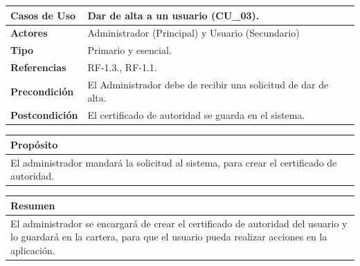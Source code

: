 \begin{itemize}
    \begin{table}[h!]
        \centering
        \begin{tabular}{|l|p{}|}
            \hline
            \textbf{Casos de Uso}   &   Dar de alta a un usuario (CU\_03). \\
            \hline 
            \textbf{Actores}        &   Administrador (Principal) y Usuario (Secundario)\\ 
            \hline 
            \textbf{Tipo}           &   Primario y esencial. \\ 
            \hline
            \textbf{Referencias}    &   RF-1.3., RF-1.1. \\ 
            \hline
            \textbf{Precondición}   &   El Administrador debe de recibir una solicitud de dar de alta. \\ 
            \hline
            \textbf{Postcondición}  &   El certificado de autoridad se guarda en el sistema. \\ 
            \hline
        \end{tabular}
        
        \vspace{5mm}
        
        \begin{tabular}{|p{\textwidth}|}
            \hline
            \rowcolor{SeaGreen} \textbf{Propósito} \\
            \hline
            \multicolumn{1}{|p{12cm}|}{El administrador mandará la solicitud al sistema, para crear el certificado de autoridad.} \\ [0.5ex]
            \hline
        \end{tabular}
        
        \vspace{5mm}
        
        \begin{tabular}{|p{\textwidth}|}
            \hline
            \rowcolor{SeaGreen} \textbf{Resumen} \\
            \hline
            \multicolumn{1}{|p{12cm}|}{El administrador se encargará de crear el certificado de autoridad del usuario y
            lo guardará en la cartera, para que el usuario pueda realizar acciones en la aplicación.} \\ [0.5ex]
            \hline
        \end{tabular}
        
        \vspace{5mm}
        

\end{table}
\end{itemize}

